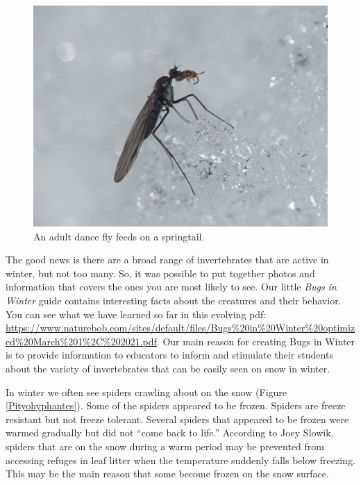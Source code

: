 \begin{multicols}{2}

\begin{figure}[H]
\begin{center}
\vspace{2mm}
\includegraphics[width=\textwidth]{img/dance_fly.jpg}
\caption{An adult dance fly feeds on a springtail.}
\label{dance_fly}
\end{center}
\end{figure}

The good news is there are a broad range of invertebrates that are active in winter, but not too many. So, it was possible to put together photos and information that covers the ones you are most likely to see. Our little \textit{Bugs in Winter} guide contains interesting facts about the creatures and their behavior. You can see what we have learned so far in this evolving pdf: \url{https://www.naturebob.com/sites/default/files/Bugs%20in%20Winter%20optimized%20March%201%2C%202021.pdf}. Our main reason for creating Bugs in Winter is to provide information to educators to inform and stimulate their students about the variety of invertebrates that can be easily seen on snow in winter. 

In winter we often see spiders crawling about on the snow (Figure \ref{Pityohyphantes}). Some of the spiders appeared to be frozen. Spiders are freeze resistant but not freeze tolerant. Several spiders that appeared to be frozen were warmed gradually but did not ``come back to life.'' According to Joey Slowik, spiders that are on the snow during a warm period may be prevented from accessing refuges in leaf litter when the temperature suddenly falls below freezing. This may be the main reason that some become frozen on the snow surface.


\end{multicols}
